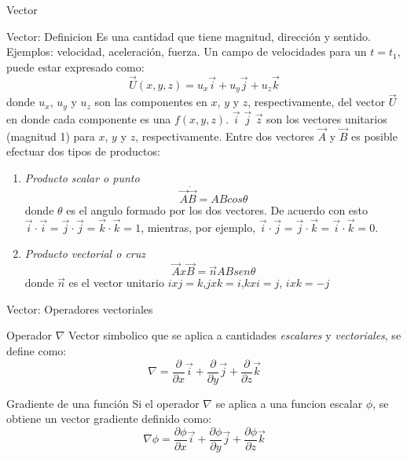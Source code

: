 \documentclass [xcolor=svgnames, t] {beamer}
\begin{document}
\begin{frame}{Vector}
\begin{block}{Vector: Definicion}
Es una cantidad que tiene magnitud, direcci\'on y sentido. Ejemplos: velocidad, aceleraci\'on, fuerza. Un campo de velocidades para un $t=t_1$, puede estar expresado como:
$$
\vec{U}(x,y,z)=u_x \vec{i} + u_y \vec{j} + u_z \vec{k}
$$ 
donde $u_x$, $u_y$ y $u_z$ son las componentes en $x$, $y$ y $z$, respectivamente, del vector $\vec{U}$ en donde cada componente es una $f(x,y,z)$. $\vec{i}$ $\vec{j}$ $\vec{z}$ son los vectores unitarios (magnitud 1) para $x$, $y$ y $z$, respectivamente. 
Entre dos vectores $\vec{A}$ y $\vec{B}$ es posible efectuar dos tipos de productos:
\begin{enumerate}
\item \emph{Producto scalar o punto}
$$
\vec{A}\dot \vec{B} = ABcos \theta
$$
donde $\theta$ es el angulo formado por los dos vectores. De acuerdo con esto $\vec{i} \cdot \vec{i} = \vec{j} \cdot \vec{j}= \vec{k} \cdot \vec{k} = 1$, mientras, por ejemplo, $\vec{i} \cdot \vec{j} = \vec{j} \cdot \vec{k} =\vec{i} \cdot \vec{k} = 0$.
\item \emph{Producto vectorial o cruz}
$$
\vec{A} x \vec{B} = \vec{n}AB sen \theta
$$
donde $\vec{n}$ es el vector unitario $ixj=k$,$jxk=i$,$k x i = j$, $ixk=-j$ 
\end{enumerate}
\end{block}
\end{frame}


\begin{frame}{Vector: Operadores vectoriales}
\begin{block}{Operador $\nabla$}
Vector simbolico que se aplica a cantidades \emph{escalares} y \emph{vectoriales}, se define como:
\begin{equation}
\nabla = \frac{\partial }{\partial x}\vec{i} + \frac{\partial }{\partial y}\vec{j} + \frac{\partial }{\partial z}\vec{k}
\label{nb}
\end{equation}
\end{block}
\begin{block}{Gradiente de una funci\'on}
Si el operador $\nabla$ se aplica a una funcion escalar $\phi$, se obtiene un vector gradiente definido como:
\begin{equation}
\nabla \phi = \frac{\partial \phi}{\partial x}\vec{i} + \frac{\partial \phi}{\partial y}\vec{j} + \frac{\partial \phi}{\partial z}\vec{k}
\label{phi}
\end{equation}
\end{block}
\end{frame}
\end{document}
